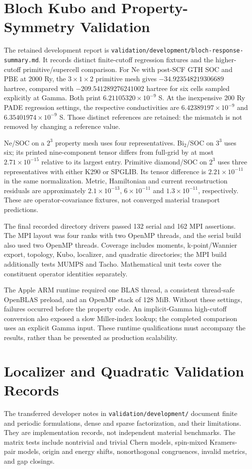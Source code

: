 \documentclass[11pt]{article}
\begin{document}
\section{Bloch Kubo and Property-Symmetry Validation}
\label{sec:si-kubo}
The retained development report is
\texttt{validation/development/bloch-response-summary.md}.
It records distinct finite-cutoff regression fixtures and the
higher-cutoff primitive/supercell comparison.
For Ne with post-SCF GTH SOC and PBE at 2000 Ry, the
$3\times1\times2$ primitive mesh gives
$-34.923548219306689$ hartree, compared with
$-209.541289276241002$ hartree for six cells sampled explicitly
at Gamma. Both print $6.21105320\times10^{-9}$ S.
At the inexpensive 200 Ry PADE regression settings, the respective
conductivities are $6.42389197\times10^{-9}$ and
$6.35401974\times10^{-9}$ S. Those distinct references are retained:
the mismatch is not removed by changing a reference value.

Ne/SOC on a $2^3$ property mesh uses four representatives.
Bi$_2$/SOC on $3^3$ uses six; its printed nine-component tensor
differs from full-grid by at most $2.71\times10^{-15}$ relative
to its largest entry. Primitive diamond/SOC on $2^3$ uses three
representatives with either K290 or SPGLIB.
Its tensor difference is $2.21\times10^{-11}$ in the same normalization.
Metric, Hamiltonian and current reconstruction residuals are
approximately $2.1\times10^{-13}$, $6\times10^{-11}$ and
$1.3\times10^{-11}$, respectively.
These are operator-covariance fixtures, not converged material
transport predictions.

The final recorded directory drivers passed 132 serial and
162 MPI assertions. The MPI layout was four ranks with two
OpenMP threads, and the serial build also used two OpenMP threads.
Coverage includes moments, k-point/Wannier export, topology, Kubo,
localizer, and quadratic directories; the MPI build additionally
tests MUMPS and Tacho. Mathematical unit tests cover the constituent
operator identities separately.

The Apple ARM runtime required one BLAS thread, a consistent
thread-safe OpenBLAS preload, and an OpenMP stack of 128 MiB.
Without these settings, failures occurred before the property code.
An implicit-Gamma high-cutoff conversion also exposed a slow
Miller-index lookup; the completed comparison uses an explicit
Gamma input. These runtime qualifications must accompany the
results, rather than be presented as production scalability.

\section{Localizer and Quadratic Validation Records}
\label{sec:si-solver-tests}
The transferred developer notes in
\texttt{validation/development/} document finite and periodic
formulations, dense and sparse factorization, and their limitations.
They are implementation records, not independent material benchmarks.
The matrix tests include nontrivial and trivial Chern models,
spin-mixed Kramers-pair models, origin and energy shifts,
nonorthogonal congruences, invalid metrics, and gap closings.
\end{document}
